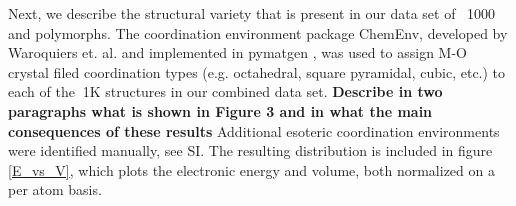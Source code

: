 %


%
Next, we describe the structural variety that is present in our data set of ~1000 \IrOtwo and \IrOthree polymorphs.
The coordination environment package ChemEnv, developed by Waroquiers et. al. \cite{Waroquiers2017} and implemented in pymatgen \cite{Ong2013}, was used to assign M-O crystal filed coordination types (e.g. octahedral, square pyramidal, cubic, etc.) to each of the $~$1K structures in our combined data set.
%
{\bf Describe in two paragraphs what is shown in Figure 3 and in what the main consequences of these results}
Additional esoteric coordination environments were identified manually, see SI.
The resulting distribution is included in figure \ref{E_vs_V}, which plots the electronic energy and volume, both normalized on a per atom basis.



